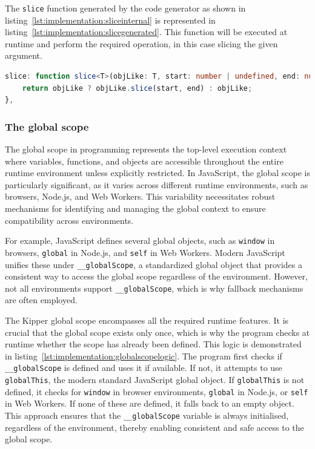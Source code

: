 The \lstinline|slice| function generated by the code generator as shown in listing~\ref{lst:implementation:sliceinternal} is represented in listing~\ref{lst:implementation:slicegenerated}. This function will be executed at runtime and perform the required operation, in this case slicing the given argument.

\begin{lstlisting}[language=TypeScript,caption=Slice in the target language TypeScript,label=lst:implementation:slicegenerated]
slice: function slice<T>(objLike: T, start: number | undefined, end: number | undefined): T {
	return objLike ? objLike.slice(start, end) : objLike;
},
\end{lstlisting}

\subsubsection{The global scope}

The global scope in programming represents the top-level execution context where variables, functions, and objects are accessible throughout the entire runtime environment unless explicitly restricted. In JavaScript, the global scope is particularly significant, as it varies across different runtime environments, such as browsers, Node.js, and Web Workers. This variability necessitates robust mechanisms for identifying and managing the global context to ensure compatibility across environments.

For example, JavaScript defines several global objects, such as \lstinline|window| in browsers, \lstinline|global| in Node.js, and \lstinline|self| in Web Workers. Modern JavaScript unifies these under \lstinline|__globalScope|, a standardized global object that provides a consistent way to access the global scope regardless of the environment. However, not all environments support \lstinline|__globalScope|, which is why fallback mechanisms are often employed.

The Kipper global scope encompasses all the required runtime features. It is crucial that the global scope exists only once, which is why the program checks at runtime whether the scope has already been defined. This logic is demonstrated in listing~\ref{lst:implementation:globalscopelogic}. The program first checks if \lstinline|__globalScope| is defined and uses it if available. If not, it attempts to use \lstinline|globalThis|, the modern standard JavaScript global object. If \lstinline|globalThis| is not defined, it checks for \lstinline|window| in browser environments, \lstinline|global| in Node.js, or \lstinline|self| in Web Workers. If none of these are defined, it falls back to an empty object. This approach ensures that the \lstinline|__globalScope| variable is always initialised, regardless of the environment, thereby enabling consistent and safe access to the global scope.

